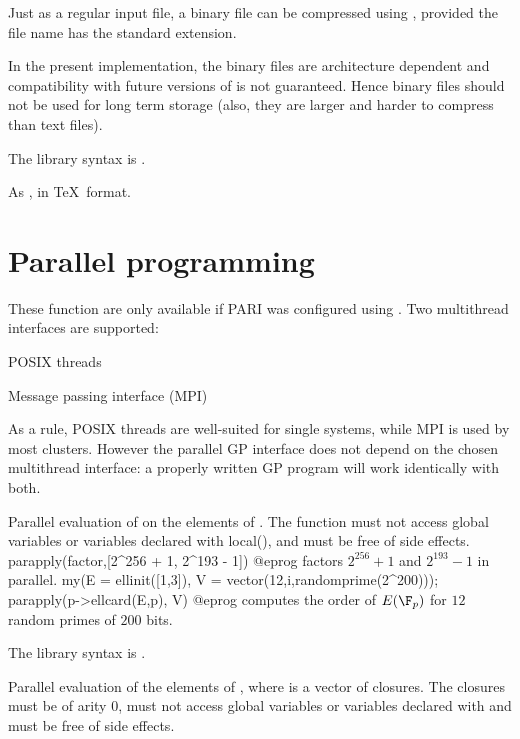 {Just as a regular input file, a binary file can be compressed
using , provided the file name has the standard 
extension.

In the present implementation, the binary files are architecture dependent
and compatibility with future versions of  is not guaranteed. Hence
binary files should not be used for long term storage (also, they are
larger and harder to compress than text files).

The library syntax is .

\label{se:writetex}
As , in \TeX\ format.

\section{Parallel programming}

These function are only available if PARI was configured using . Two multithread interfaces are supported:

\item POSIX threads

\item Message passing interface (MPI)

As a rule, POSIX threads are well-suited for single systems, while MPI is used
by most clusters. However the parallel GP interface does not depend on the
chosen multithread interface: a properly written GP program will work
identically with both.


\label{se:parapply}
Parallel evaluation of  on the elements of .
The function  must not access global variables or variables
declared with local(), and must be free of side effects.
\bprog
parapply(factor,[2^256 + 1, 2^193 - 1])
@eprog
factors $2^{256} + 1$ and $2^{193} - 1$ in parallel.
\bprog
{
  my(E = ellinit([1,3]), V = vector(12,i,randomprime(2^200)));
  parapply(p->ellcard(E,p), V)
}
@eprog
computes the order of $E(\F_p)$ for $12$ random primes of $200$ bits.

The library syntax is .

\label{se:pareval}
Parallel evaluation of the elements of , where  is a
vector of closures. The closures must be of arity $0$, must not access
global variables or variables declared with  and must be
free of side effects.

}
